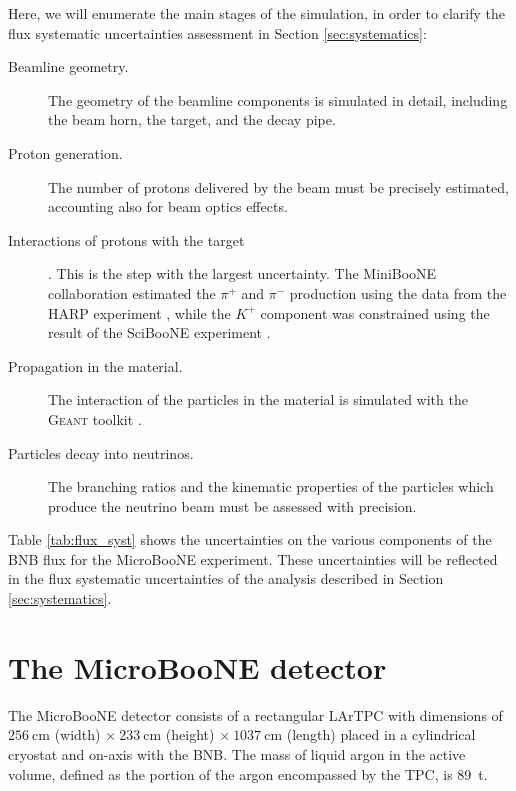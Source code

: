 Here, we will enumerate the main stages of the simulation, in order to clarify the flux systematic uncertainties assessment in Section \ref{sec:systematics}:
\begin{description}
\item[Beamline geometry.] The geometry of the beamline components is simulated in detail, including the beam horn, the target, and the decay pipe. 
\item[Proton generation.] The number of protons delivered by the beam must be precisely estimated, accounting also for beam optics effects.
\item[Interactions of protons with the target]. This is the step with the largest uncertainty. The MiniBooNE collaboration estimated the $\pi^+$ and $\pi^-$ production using the data from the HARP experiment \cite{Catanesi:2005rc}, while the $K^+$ component was constrained using the result of the SciBooNE experiment \cite{Cheng:2011wq}. 
\item[Propagation in the material.] The interaction of the particles in the material is simulated with the \textsc{Geant} toolkit \cite{Brun:1994aa}.
\item[Particles decay into neutrinos.] The branching ratios and the kinematic properties of the particles which produce the neutrino beam must be assessed with precision.
\end{description}

Table \ref{tab:flux_syst} shows the uncertainties on the various components of the BNB flux for the MicroBooNE experiment. These uncertainties will be reflected in the flux systematic uncertainties of the analysis described in Section \ref{sec:systematics}.

\section{The MicroBooNE detector}\label{sec:detector}
The MicroBooNE detector consists of a rectangular LArTPC with dimensions of $256~$cm (width) $\times~233~$cm (height) $\times~1037~$cm (length) placed in a cylindrical cryostat and on-axis with the BNB. The mass of liquid argon in the active volume, defined as the portion of the argon encompassed by the TPC, is 89~t. 

